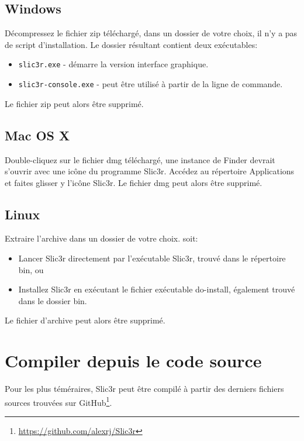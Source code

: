 \subsection{Windows}

D\'ecompressez le fichier zip t\'el\'echarg\'e, dans un dossier de votre choix, il n'y a pas de script d'installation. Le dossier r\'esultant contient deux ex\'ecutables:
\begin{itemize}
\item \texttt{slic3r.exe} - d\'emarre la version interface graphique.
\item \texttt{slic3r-console.exe} - peut \^etre utilis\'e \`a partir de la ligne de commande.
\end{itemize}

Le fichier zip peut alors \^etre supprim\'e.

\subsection{Mac OS X}

Double-cliquez sur le fichier dmg t\'el\'echarg\'e, une instance de Finder devrait s'ouvrir avec une ic\^one du programme Slic3r. Acc\'edez au r\'epertoire Applications et faites glisser y l'ic\^one Slic3r.
Le fichier dmg peut alors \^etre supprim\'e.

\subsection{Linux}

Extraire l'archive dans un dossier de votre choix.
soit:
\begin{itemize}
\item Lancer Slic3r directement par l'ex\'ecutable Slic3r, trouv\'e dans le r\'epertoire bin, ou
\item Installez Slic3r en ex\'ecutant le fichier ex\'ecutable do-install, \'egalement trouv\'e dans le dossier bin.
\end{itemize}
Le fichier d'archive peut alors \^etre supprim\'e.



\section{Compiler depuis le code source} %
\label{sec:building_from_source}

Pour les plus t\'em\'eraires, Slic3r peut \^etre compil\'e \`a partir des derniers fichiers sources trouv\'ees sur GitHub\footnote{\url{https://github.com/alexrj/Slic3r}}.


